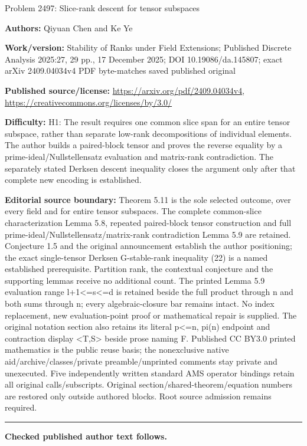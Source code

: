 \documentclass[10pt]{article}
\theoremstyle{definition}
\begin{document}
\begin{center}\Large Problem 2497: Slice-rank descent for tensor subspaces\end{center}\noindent\textbf{Authors:} Qiyuan Chen and Ke Ye\par\noindent\textbf{Work/version:} Stability of Ranks under Field Extensions; Published Discrete Analysis 2025:27, 29 pp., 17 December 2025; DOI 10.19086/da.145807; exact arXiv 2409.04034v4 PDF byte-matches saved published original\par\noindent\textbf{Published source/license:} \url{https://arxiv.org/pdf/2409.04034v4}, \url{https://creativecommons.org/licenses/by/3.0/}\par\noindent\textbf{Difficulty:} H1: The result requires one common slice span for an entire tensor subspace, rather than separate low-rank decompositions of individual elements. The author builds a paired-block tensor and proves the reverse equality by a prime-ideal/Nullstellensatz evaluation and matrix-rank contradiction. The separately stated Derksen descent inequality closes the argument only after that complete new encoding is established.\par\medskip\noindent\textbf{Editorial source boundary:} Theorem 5.11 is the sole selected outcome, over every field and for entire tensor subspaces. The complete common-slice characterization Lemma 5.8, repeated paired-block tensor construction and full prime-ideal/Nullstellensatz/matrix-rank contradiction Lemma 5.9 are retained. Conjecture 1.5 and the original announcement establish the author positioning; the exact single-tensor Derksen G-stable-rank inequality (22) is a named established prerequisite. Partition rank, the contextual conjecture and the supporting lemmas receive no additional count. The printed Lemma 5.9 evaluation range l+1<=s<=d is retained beside the full product through n and both sums through n; every algebraic-closure bar remains intact. No index replacement, new evaluation-point proof or mathematical repair is supplied. The original notation section also retains its literal p<=n, pi(n) endpoint and contraction display <T,S> beside prose naming F. Published CC BY3.0 printed mathematics is the public reuse basis; the nonexclusive native aid/archive/classes/private preamble/unprinted comments stay private and unexecuted. Five independently written standard AMS operator bindings retain all original calls/subscripts. Original section/shared-theorem/equation numbers are restored only outside authored blocks. Root source admission remains required.\par\medskip\hrule\medskip\noindent\textbf{Checked published author text follows.}\par
\end{document}
